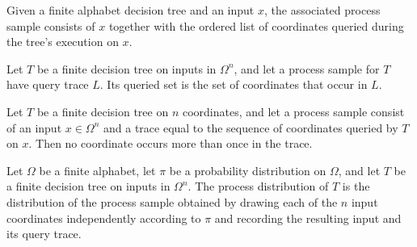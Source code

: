 \begin{definition}
\label{FABL.FiniteDecisionTree.ProcessSample.ofInput}
\leanok
{}
Given a finite alphabet decision tree and an input $x$, the associated process sample
consists of $x$ together with the ordered list of coordinates queried during the tree's
execution on $x$.
\end{definition}

\begin{definition}
\label{FABL.FiniteDecisionTree.ProcessSample.queriedSet}
\leanok
{}
Let $T$ be a finite decision tree on inputs in $\Omega^n$, and let a process sample for
$T$ have query trace $L$. Its queried set is the set of coordinates that occur in $L$.
\end{definition}

\begin{theorem}
\label{FABL.FiniteDecisionTree.ProcessSample.trace_nodup}
\leanok
{}
Let $T$ be a finite decision tree on $n$ coordinates, and let a process sample consist
of an input $x\in\Omega^n$ and a trace equal to the sequence of coordinates queried by
$T$ on $x$. Then no coordinate occurs more than once in the trace.
\end{theorem}

\begin{definition}
\label{FABL.FiniteDecisionTree.decisionTreeProcessPMF}
\leanok
{}
Let $\Omega$ be a finite alphabet, let $\pi$ be a probability distribution on $\Omega$,
and let $T$ be a finite decision tree on inputs in $\Omega^n$. The process distribution
of $T$ is the distribution of the process sample obtained by drawing each of the $n$
input coordinates independently according to $\pi$ and recording the resulting input and
its query trace.
\end{definition}

